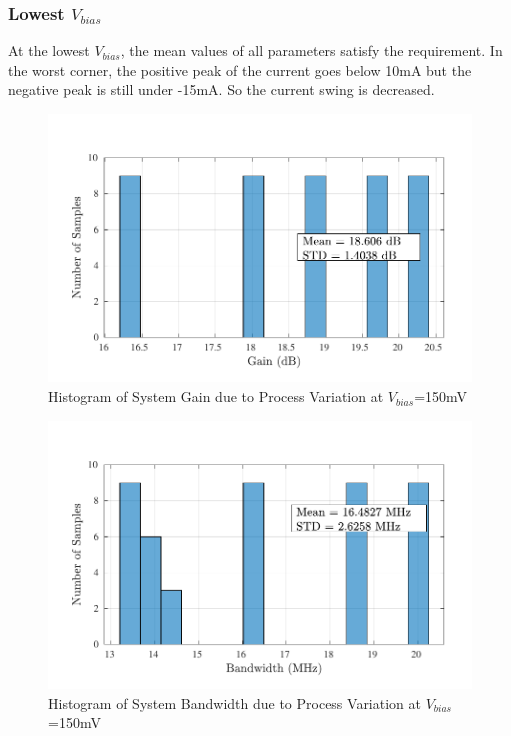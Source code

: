 \subsubsection{Lowest $V_{bias}$}
At the lowest $V_{bias}$, the mean values of all parameters satisfy the requirement. In the worst corner, the positive peak of the current goes below 10mA but the negative peak is still under -15mA. So the current swing is decreased. 
\begin{figure} [H]
\centering
\includegraphics[scale=1]{Figures/Corners/Overall/Proc_Min/PDFs/Proc_Min_gain.pdf}
\caption{Histogram of System Gain due to Process Variation at $V_{bias}$=150mV}
\end{figure}

\begin{figure} [H]
\centering
\includegraphics[scale=1]{Figures/Corners/Overall/Proc_Min/PDFs/Proc_Min_bw.pdf}
\caption{Histogram of System Bandwidth due to Process Variation at $V_{bias}$=150mV}
\end{figure}

